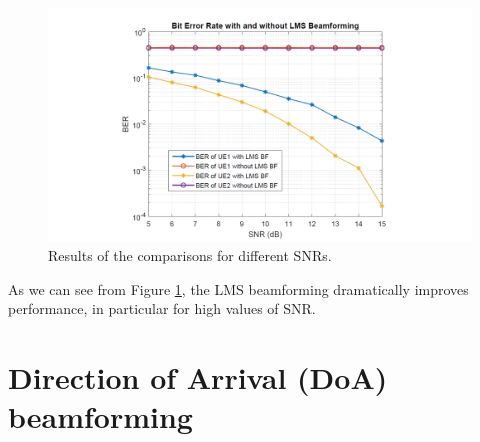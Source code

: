 \documentclass[a4paper,10pt]{article}
\begin{document}
\begin{figure}[H]
	\centering
	\includegraphics[width=\linewidth]{bersnr.png}
	\caption{\label{fig:bersnr}Results of the comparisons for different SNRs.}
\end{figure}
As we can see from Figure \ref{fig:bersnr}, the LMS beamforming dramatically improves performance, in particular for high values of SNR.
\section{Direction of Arrival (DoA) beamforming}
\end{document}

